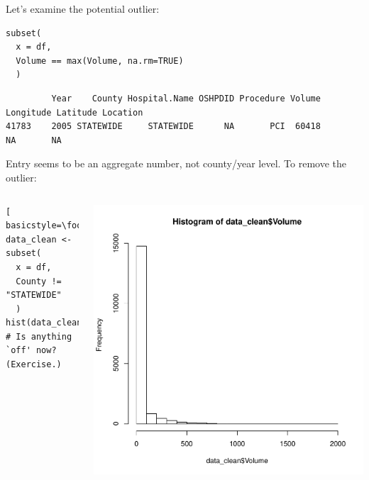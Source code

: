 \begin{frame}
Let's examine the potential outlier:
  \begin{lstlisting}
subset(
  x = df, 
  Volume == max(Volume, na.rm=TRUE)
  )
  \end{lstlisting}
{ \tiny
\begin{verbatim}
         Year    County Hospital.Name OSHPDID Procedure Volume Longitude Latitude Location
41783    2005 STATEWIDE     STATEWIDE      NA       PCI  60418        NA       NA         
\end{verbatim}
}

\newpage

Entry seems to be an aggregate number, not county/year level.  To remove the outlier:

    \begin{columns}
  \begin{lstlisting}[ basicstyle=\footnotesize]
data_clean <- subset(
  x = df, 
  County != "STATEWIDE"
  )
hist(data_clean$Volume)
# Is anything `off' now? (Exercise.)
  \end{lstlisting}

    \begin{center}
       \includegraphics[scale=0.3]{images/histogram2.pdf}
    \end{center}   
\end{columns}

\end{frame}


